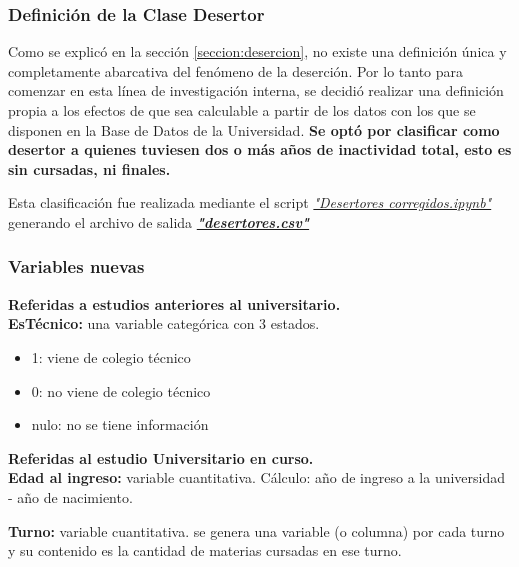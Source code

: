 \subsubsection{Definición de la Clase Desertor}\label{definicion_clase_desertor}

Como se explicó en la sección \ref{seccion:desercion}, no existe una definición única y completamente abarcativa del fenómeno de la deserción. 
Por lo tanto para comenzar en esta línea de investigación interna, se decidió realizar una definición propia a los efectos de que sea calculable a partir de los datos con los que se disponen en la  Base de Datos de la Universidad. \textbf{Se optó por clasificar como desertor a quienes tuviesen dos o más años de inactividad total, esto es sin cursadas, ni finales.}

Esta clasificación fue realizada mediante el script \underline{\textit{"Desertores corregidos.ipynb"}} generando el archivo de salida \underline{\textit{\textbf{"desertores.csv"}}}



\subsubsection{Variables nuevas}

\textbf{Referidas a estudios anteriores al universitario.} \\
\textbf{EsTécnico:} una variable categórica con 3 estados.
\begin{itemize}
\item 1: viene de colegio técnico
\item 0: no viene de colegio técnico
\item nulo: no se tiene información
\end{itemize}

\vspace{3mm}

\textbf{Referidas al estudio Universitario en curso.} \\
\textbf{Edad al ingreso:} variable cuantitativa. Cálculo: año de ingreso a la universidad - año de nacimiento.

\vspace{3mm}

\textbf{Turno:} variable cuantitativa. se genera una variable (o columna) por cada turno y su contenido es la cantidad de materias cursadas en ese turno.

\vspace{3mm}

